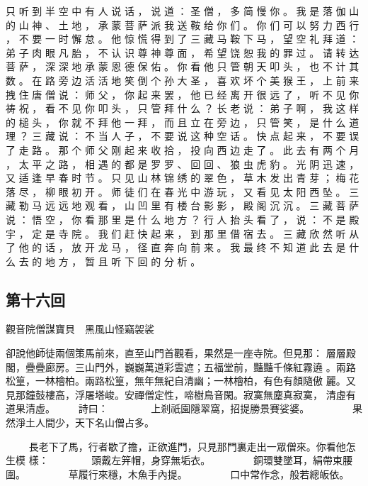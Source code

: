 {只 听 到 半 空 中 有 人 说 话 ， 说 道 ： 圣 僧 ， 多 简 慢 你 。
我 是 落 伽 山 的 山 神 、 土 地 ， 承 蒙 菩 萨 派 我 送 鞍 给 你 们 。
你 们 可 以 努 力 西 行 ， 不 要 一 时 懈 怠 。
他 惊 慌 得 到 了 三 藏 马 鞍 下 马 ， 望 空 礼 拜 道 ： 弟 子 肉 眼 凡 胎 ， 不 认 识 尊 神 尊 面 ， 希 望 饶 恕 我 的 罪 过 。
请 转 达 菩 萨 ， 深 深 地 承 蒙 恩 德 保 佑 。
你 看 他 只 管 朝 天 叩 头 ， 也 不 计 其 数 。
在 路 旁 边 活 活 地 笑 倒 个 孙 大 圣 ， 喜 欢 坏 个 美 猴 王 ， 上 前 来 拽 住 唐 僧 说 ： 师 父 ， 你 起 来 罢 ， 他 已 经 离 开 很 远 了 ， 听 不 见 你 祷 祝 ， 看 不 见 你 叩 头 ， 只 管 拜 什 么 ？ 长 老 说 ： 弟 子 啊 ， 我 这 样 的 槌 头 ， 你 就 不 拜 他 一 拜 ， 而 且 立 在 旁 边 ， 只 管 笑 ， 是 什 么 道 理 ？
三 藏 说 ： 不 当 人 子 ， 不 要 说 这 种 空 话 。
快 点 起 来 ， 不 要 误 了 走 路 。
那 个 师 父 刚 起 来 收 拾 ， 投 向 西 边 走 了 。
此 去 有 两 个 月 ， 太 平 之 路 ， 相 遇 的 都 是 罗 罗 、 回 回 、 狼 虫 虎 豹 。
光 阴 迅 速 ， 又 适 逢 早 春 时 节 。
只 见 山 林 锦 绣 的 翠 色 ， 草 木 发 出 青 芽 ； 梅 花 落 尽 ， 柳 眼 初 开 。
师 徒 们 在 春 光 中 游 玩 ， 又 看 见 太 阳 西 坠 。
三 藏 勒 马 远 远 地 观 看 ， 山 凹 里 有 楼 台 影 影 ， 殿 阁 沉 沉 。
三 藏 菩 萨 说 ： 悟 空 ， 你 看 那 里 是 什 么 地 方 ？ 行 人 抬 头 看 了 ， 说 ： 不 是 殿 宇 ， 定 是 寺 院 。
我 们 赶 快 起 来 ， 到 那 里 借 宿 去 。
三 藏 欣 然 听 从 了 他 的 话 ， 放 开 龙 马 ， 径 直 奔 向 前 来 。
我 最 终 不 知 道 此 去 是 什 么 去 的 地 方 ， 暂 且 听 下 回 的 分 析 。
}\switchcolumn\flushpage  \begin{pinyinscope}{\myfontt \section{第十六回}     觀音院僧謀寶貝　黑風山怪竊袈裟

卻說他師徒兩個策馬前來，直至山門首觀看，果然是一座寺院。但見那：
層層殿閣，疊疊廊房。三山門外，巍巍萬道彩雲遮；五福堂前，豔豔千條紅霧遶
。兩路松篁，一林檜柏。兩路松篁，無年無紀自清幽；一林檜柏，有色有顏隨傲
麗。又見那鐘鼓樓高，浮屠塔峻。安禪僧定性，啼樹鳥音閑。寂寞無塵真寂寞，
清虛有道果清虛。
　　詩曰：
　　　　上剎祇園隱翠窩，招提勝景賽娑婆。
　　　　果然淨土人間少，天下名山僧占多。

　　
長老下了馬，行者歇了擔，正欲進門，只見那門裏走出一眾僧來。你看他怎生模
樣：
　　　　頭戴左笄帽，身穿無垢衣。
　　　　銅環雙墜耳，絹帶束腰圍。
　　　　草履行來穩，木魚手內提。
　　　　口中常作念，般若總皈依。

}
\end{pinyinscope}
